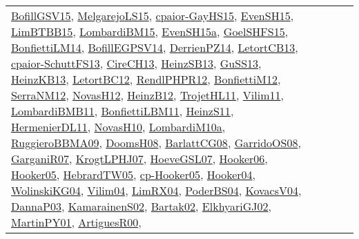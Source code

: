 {\begin{longtable}{lp{3cm}>{\raggedright}p{6cm}>{\raggedright}p{6cm}p{8cm}}
\href{papers/BofillGSV15.pdf}{BofillGSV15}\cite{BofillGSV15}, \href{papers/MelgarejoLS15.pdf}{MelgarejoLS15}\cite{MelgarejoLS15}, \href{papers/cpaior-GayHS15.pdf}{cpaior-GayHS15}\cite{cpaior-GayHS15}, \href{papers/EvenSH15.pdf}{EvenSH15}\cite{EvenSH15}, \href{papers/LimBTBB15.pdf}{LimBTBB15}\cite{LimBTBB15}, \href{papers/LombardiBM15.pdf}{LombardiBM15}\cite{LombardiBM15}, \href{articles/EvenSH15a.pdf}{EvenSH15a}\cite{EvenSH15a}, \href{articles/GoelSHFS15.pdf}{GoelSHFS15}\cite{GoelSHFS15}, \href{papers/BonfiettiLM14.pdf}{BonfiettiLM14}\cite{BonfiettiLM14}, \href{papers/BofillEGPSV14.pdf}{BofillEGPSV14}\cite{BofillEGPSV14}, \href{papers/DerrienPZ14.pdf}{DerrienPZ14}\cite{DerrienPZ14}, \href{papers/LetortCB13.pdf}{LetortCB13}\cite{LetortCB13}, \href{papers/cpaior-SchuttFS13.pdf}{cpaior-SchuttFS13}\cite{cpaior-SchuttFS13}, \href{papers/CireCH13.pdf}{CireCH13}\cite{CireCH13}, \href{articles/HeinzSB13.pdf}{HeinzSB13}\cite{HeinzSB13}, \href{papers/GuSS13.pdf}{GuSS13}\cite{GuSS13}, \href{papers/HeinzKB13.pdf}{HeinzKB13}\cite{HeinzKB13}, \href{papers/LetortBC12.pdf}{LetortBC12}\cite{LetortBC12}, \href{papers/RendlPHPR12.pdf}{RendlPHPR12}\cite{RendlPHPR12}, \href{papers/BonfiettiM12.pdf}{BonfiettiM12}\cite{BonfiettiM12}, \href{papers/SerraNM12.pdf}{SerraNM12}\cite{SerraNM12}, \href{articles/NovasH12.pdf}{NovasH12}\cite{NovasH12}, \href{papers/HeinzB12.pdf}{HeinzB12}\cite{HeinzB12}, \href{articles/TrojetHL11.pdf}{TrojetHL11}\cite{TrojetHL11}, \href{papers/Vilim11.pdf}{Vilim11}\cite{Vilim11}, \href{papers/LombardiBMB11.pdf}{LombardiBMB11}\cite{LombardiBMB11}, \href{papers/BonfiettiLBM11.pdf}{BonfiettiLBM11}\cite{BonfiettiLBM11}, \href{papers/HeinzS11.pdf}{HeinzS11}\cite{HeinzS11}, \href{papers/HermenierDL11.pdf}{HermenierDL11}\cite{HermenierDL11}, \href{articles/NovasH10.pdf}{NovasH10}\cite{NovasH10}, \href{articles/LombardiM10a.pdf}{LombardiM10a}\cite{LombardiM10a}, \href{articles/RuggieroBBMA09.pdf}{RuggieroBBMA09}\cite{RuggieroBBMA09}, \href{papers/DoomsH08.pdf}{DoomsH08}\cite{DoomsH08}, \href{papers/BarlattCG08.pdf}{BarlattCG08}\cite{BarlattCG08}, \href{articles/GarridoOS08.pdf}{GarridoOS08}\cite{GarridoOS08}, \href{papers/GarganiR07.pdf}{GarganiR07}\cite{GarganiR07}, \href{papers/KrogtLPHJ07.pdf}{KrogtLPHJ07}\cite{KrogtLPHJ07}, \href{papers/HoeveGSL07.pdf}{HoeveGSL07}\cite{HoeveGSL07}, \href{articles/Hooker06.pdf}{Hooker06}\cite{Hooker06}, \href{articles/Hooker05.pdf}{Hooker05}\cite{Hooker05}, \href{papers/HebrardTW05.pdf}{HebrardTW05}\cite{HebrardTW05}, \href{papers/cp-Hooker05.pdf}{cp-Hooker05}\cite{cp-Hooker05}, \href{papers/Hooker04.pdf}{Hooker04}\cite{Hooker04}, \href{papers/WolinskiKG04.pdf}{WolinskiKG04}\cite{WolinskiKG04}, \href{papers/Vilim04.pdf}{Vilim04}\cite{Vilim04}, \href{papers/LimRX04.pdf}{LimRX04}\cite{LimRX04}, \href{articles/PoderBS04.pdf}{PoderBS04}\cite{PoderBS04}, \href{papers/KovacsV04.pdf}{KovacsV04}\cite{KovacsV04}, \href{papers/DannaP03.pdf}{DannaP03}\cite{DannaP03}, \href{papers/KamarainenS02.pdf}{KamarainenS02}\cite{KamarainenS02}, \href{papers/Bartak02.pdf}{Bartak02}\cite{Bartak02}, \href{papers/ElkhyariGJ02.pdf}{ElkhyariGJ02}\cite{ElkhyariGJ02}, \href{articles/MartinPY01.pdf}{MartinPY01}\cite{MartinPY01}, \href{articles/ArtiguesR00.pdf}{ArtiguesR00}\cite{ArtiguesR00}, 
\end{longtable}}
